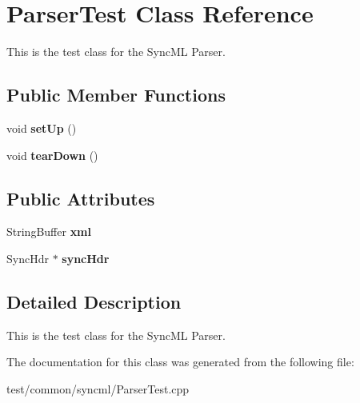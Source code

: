 \section{Parser\-Test Class Reference}
\label{classParserTest}
This is the test class for the Sync\-ML Parser.  


\subsection*{Public Member Functions}
\begin{CompactItemize}
\item 
void \textbf{set\-Up} ()\label{classParserTest_d66ad6d8de4db6b9f02f90961bdcf645}

\item 
void \textbf{tear\-Down} ()\label{classParserTest_95d45f37a022ec87685f15818671971d}

\end{CompactItemize}
\subsection*{Public Attributes}
\begin{CompactItemize}
\item 
String\-Buffer \textbf{xml}\label{classParserTest_a23899e32bcbc1c42f5ac36e0dce7205}

\item 
Sync\-Hdr $\ast$ \textbf{sync\-Hdr}\label{classParserTest_5fe936ee6676038a7814c7bfecbcc394}

\end{CompactItemize}


\subsection{Detailed Description}
This is the test class for the Sync\-ML Parser. 



The documentation for this class was generated from the following file:\begin{CompactItemize}
\item 
test/common/syncml/Parser\-Test.cpp\end{CompactItemize}
